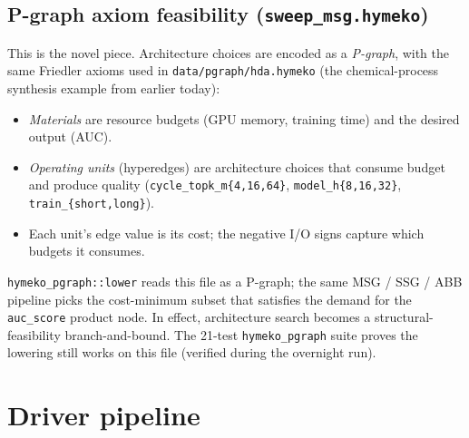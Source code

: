 \documentclass[11pt,a4paper]{article}
\newcommand{\code}[1]{\texttt{\small #1}}
\begin{document}
\subsection{P-graph axiom feasibility (\code{sweep\_msg.hymeko})}

This is the novel piece. Architecture choices are encoded as a
\emph{P-graph}, with the same Friedler axioms used in
\code{data/pgraph/hda.hymeko} (the chemical-process synthesis
example from earlier today):

\begin{itemize}
\item \emph{Materials} are resource budgets (GPU memory, training
      time) and the desired output (AUC).
\item \emph{Operating units} (hyperedges) are architecture choices
      that consume budget and produce quality
      (\code{cycle\_topk\_m\{4,16,64\}},
      \code{model\_h\{8,16,32\}},
      \code{train\_\{short,long\}}).
\item Each unit's edge value is its cost; the negative I/O signs
      capture which budgets it consumes.
\end{itemize}

\code{hymeko\_pgraph::lower} reads this file as a P-graph; the same
MSG / SSG / ABB pipeline picks the cost-minimum subset that
satisfies the demand for the \code{auc\_score} product node. In
effect, architecture search becomes a structural-feasibility
branch-and-bound. The 21-test \code{hymeko\_pgraph} suite proves
the lowering still works on this file (verified during the
overnight run).

\section{Driver pipeline}

\begin{center}
\end{center}
\end{document}
